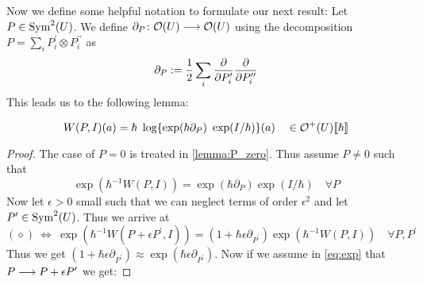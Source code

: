 Now we define some helpful notation to formulate our next result: Let $P \in \operatorname{Sym}^2(U)$. We define $\partial_P \colon \mathcal{O}(U) \longrightarrow \mathcal{O}(U)$ using the decomposition $P = \sum_i P_i^\prime \otimes P^{\prime\prime}_i$ as
\begin{equation} \partial_P := \frac{1}{2} \sum_i \frac{\partial }{\partial P_i^\prime} \frac{\partial }{\partial P^{\prime\prime}_i}\end{equation}
This leads us to the following lemma:

\begin{lem}
\label{lemma:WPI}
  \begin{equation}W(P,I)(a) = \hbar \ \log\{ \exp(\hbar \partial_P) \ \exp(I/\hbar) \} (a) \quad \in \mathcal{O}^+(U)\llbracket\hbar\rrbracket\end{equation}
\begin{proof}
  The case of $P=0$ is treated in \ref{lemma:P_zero}. Thus assume $P \neq 0$ such that
  \begin{equation}
  \label{eq:exp} \tag{$\diamond$}
    \exp( \hbar^{-1} W(P,I)) = \exp(\hbar \partial_P) \exp(I/\hbar) \quad \forall P
  \end{equation}
  Now let $\epsilon > 0$ small such that we can neglect terms of order $\epsilon^2$ and let $P^\prime \in \operatorname{Sym}^2(U)$. Thus we arrive at
  \begin{equation}
  \label{eq:exp2} \tag{$\diamond \diamond$}
    (\diamond) \ \Leftrightarrow \ \exp( \hbar^{-1} W(P+ \epsilon P^\prime,I)) = (1+ \hbar \epsilon \partial_{P^\prime}) \exp( \hbar^{-1} W(P,I)) \quad \forall P,P^\prime
  \end{equation}
  Thus we get $(1+\hbar \epsilon \partial_{P^\prime}) \approx \exp(\hbar \epsilon \partial_{P^\prime})$. Now if we assume in \eqref{eq:exp} that $P \lra P + \epsilon P^\prime$ we get:



\end{proof}
\end{lem}
